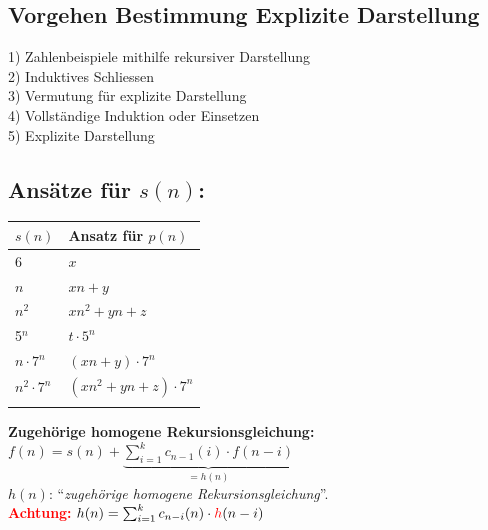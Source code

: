\documentclass[8pt,landscape]{scrartcl}
\begin{document}
\setlength{\columnsep}{1cm}
\begin{multicols}{3}


\subsection{Vorgehen Bestimmung Explizite Darstellung}
1) Zahlenbeispiele mithilfe rekursiver Darstellung\\
2) Induktives Schliessen\\
3) Vermutung f\"ur explizite Darstellung\\
4) Vollst\"andige Induktion oder Einsetzen\\
5) Explizite Darstellung

\subsection{Ans\"atze für $s(n)$:}
\begin{tabular}{ll}
$s(n)$ & Ansatz f\"ur $p(n)$ \\\hline
6      & $x$ \\
$n$      & $xn + y$ \\
$n^2$    & $xn^2 + yn + z$\\
5$^n$    & $t \cdot 5^n$ \\
$n \cdot 7^n$ & $(xn + y) \cdot 7^n$ \\
$n^2 \cdot 7^n$ & $(xn^2 + yn + z) \cdot 7^n$ \\\hline
\\
\end{tabular}

\textbf{Zugeh\"orige homogene Rekursionsgleichung:}\\
$f(n) = s(n) + \underbrace{\sum_{i=1}^k c_{n-1}(i) \cdot f(n-i)}_{= h(n)}$\\
$h(n)$: ``\textit{zugeh\"orige homogene Rekursionsgleichung}''.\\
\textbf{\textcolor{red}{Achtung:}} $h(n) = \sum_{i=1}^k c_{n-i}(n) \cdot \textcolor{red}{h}(n-i)$

\end{multicols}
\end{document}
